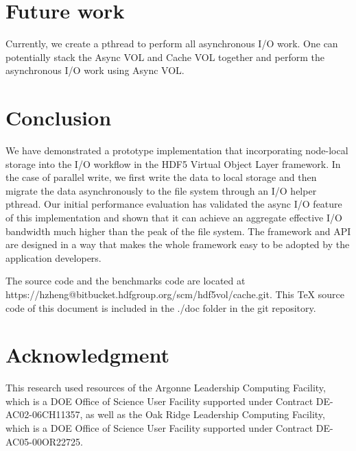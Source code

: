 \documentclass[aps, rmp, 11pt, notitlepage]{revtex4-1}
\begin{document}
\section{Future work}
\label{sec:future}
Currently, we create a pthread to perform all asynchronous I/O work. One can potentially stack the Async VOL and Cache VOL together and perform the asynchronous I/O work using Async VOL. 

\section{Conclusion}
We have demonstrated a prototype implementation that incorporating node-local storage into the I/O workflow in the HDF5 Virtual Object Layer framework. In the case of parallel write, we first write the data to local storage and then migrate the data asynchronously to the file system through an I/O helper pthread. Our initial performance evaluation has validated the async I/O feature of this implementation and shown that it can achieve an aggregate effective I/O bandwidth much higher than the peak of the file system. The framework and API are designed in a way that makes the whole framework easy to be adopted by the application developers. 

The source code and the benchmarks code are located at \\https://hzheng@bitbucket.hdfgroup.org/scm/hdf5vol/cache.git. This TeX source code of this document is included in the ./doc folder in the git repository. 
\section*{Acknowledgment}
This research used resources of the Argonne Leadership Computing Facility, which is a DOE Office of Science User Facility supported under Contract DE-AC02-06CH11357, as well as the Oak Ridge Leadership Computing Facility, which is a DOE Office of Science User Facility supported under Contract DE-AC05-00OR22725.




\end{document}
